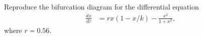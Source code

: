 \begin{problem}
Reproduce the bifurcation diagram for the differential equation
\begin{align*}
	\frac{dx}{d \tau} &= rx(1-x/k) - \frac{x^2}{1+x^2},
\end{align*}
where $r = 0.56$.
\end{problem}